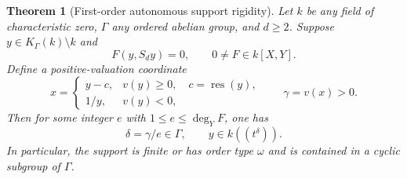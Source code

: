 \documentclass[11pt,letterpaper]{article}
\numberwithin{equation}{section}
\newtheorem{theorem}{Theorem}[section]
\theoremstyle{definition}
\theoremstyle{remark}
\newcommand{\K}{K_\Gamma(k)}
\begin{document}
\begin{theorem}[First-order autonomous support rigidity]
\label{adr:thm:collapse}
Let $k$ be any field of characteristic zero, $\Gamma$ any ordered abelian
group, and $d\ge2$. Suppose $y\in\K\setminus k$ and
\begin{equation}\label{adr:eq:F-main}
 F(y,S_dy)=0,\qquad 0\ne F\in k[X,Y].
\end{equation}
Define a positive-valuation coordinate
\begin{equation}\label{adr:eq:coordinate}
 x=\begin{cases}
 y-c,&v(y)\ge0,\quad c=\operatorname{res}(y),\\
 1/y,&v(y)<0,
 \end{cases}
 \qquad \gamma=v(x)>0.
\end{equation}
Then for some integer $e$ with $1\le e\le\deg_YF$, one has
\begin{equation}\label{adr:eq:collapse}
 \delta=\gamma/e\in\Gamma,
 \qquad y\in k((t^\delta)).
\end{equation}
In particular, the support is finite or has order type $\omega$ and is
contained in a cyclic subgroup of $\Gamma$.
\end{theorem}
\end{document}
